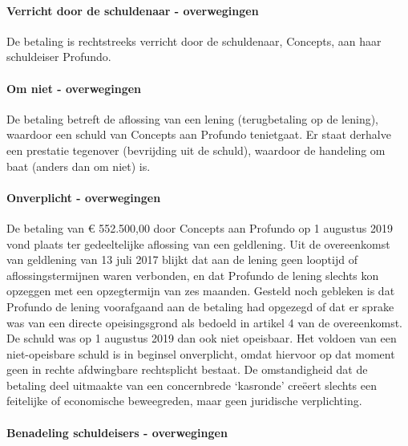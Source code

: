 \documentclass[
  dutch,
  a4paper,
]{article}
\begin{document}
\paragraph{Verricht door de schuldenaar - overwegingen}\label{verricht-door-de-schuldenaar---overwegingen-38}

De betaling is rechtstreeks verricht door de schuldenaar, Concepts, aan haar schuldeiser Profundo.

\paragraph{Om niet - overwegingen}\label{om-niet---overwegingen-38}

De betaling betreft de aflossing van een lening (terugbetaling op de lening), waardoor een schuld van Concepts aan Profundo tenietgaat. Er staat derhalve een prestatie tegenover (bevrijding uit de schuld), waardoor de handeling om baat (anders dan om niet) is.

\paragraph{Onverplicht - overwegingen}\label{onverplicht---overwegingen-38}

De betaling van € 552.500,00 door Concepts aan Profundo op 1 augustus 2019 vond plaats ter gedeeltelijke aflossing van een geldlening. Uit de overeenkomst van geldlening van 13 juli 2017 blijkt dat aan de lening geen looptijd of aflossingstermijnen waren verbonden, en dat Profundo de lening slechts kon opzeggen met een opzegtermijn van zes maanden. Gesteld noch gebleken is dat Profundo de lening voorafgaand aan de betaling had opgezegd of dat er sprake was van een directe opeisingsgrond als bedoeld in artikel 4 van de overeenkomst. De schuld was op 1 augustus 2019 dan ook niet opeisbaar. Het voldoen van een niet-opeisbare schuld is in beginsel onverplicht, omdat hiervoor op dat moment geen in rechte afdwingbare rechtsplicht bestaat. De omstandigheid dat de betaling deel uitmaakte van een concernbrede `kasronde' creëert slechts een feitelijke of economische beweegreden, maar geen juridische verplichting.

\paragraph{Benadeling schuldeisers - overwegingen}\label{benadeling-schuldeisers---overwegingen-38}
\end{document}
